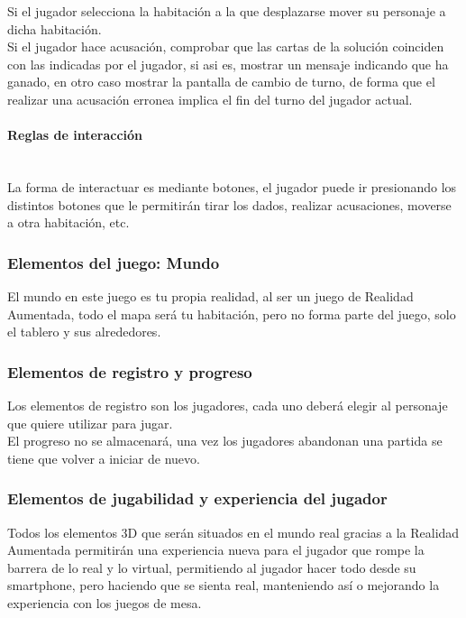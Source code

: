 Si el jugador selecciona la habitación a la que desplazarse mover su personaje a dicha habitación.\\

Si el jugador hace acusación, comprobar que las cartas de la solución coinciden con las indicadas por el jugador, si asi es, mostrar un mensaje indicando que ha ganado, en otro caso mostrar la pantalla de cambio de turno, de forma que el realizar una acusación erronea implica el fin del turno del jugador actual.

\paragraph{Reglas de interacción}\mbox{}\\
La forma de interactuar es mediante botones, el jugador puede ir presionando los distintos botones que le permitirán tirar los dados, realizar acusaciones, moverse a otra habitación, etc.

\subsubsection{Elementos del juego: Mundo}
El mundo en este juego es tu propia realidad, al ser un juego de Realidad Aumentada, todo el mapa será tu habitación, pero no forma parte del juego, solo el tablero y sus alrededores.


\subsubsection{Elementos de registro y progreso}
Los elementos de registro son los jugadores, cada uno deberá elegir al personaje que quiere utilizar para jugar.\\

El progreso no se almacenará, una vez los jugadores abandonan una partida se tiene que volver a iniciar de nuevo.

\subsubsection{Elementos de jugabilidad y experiencia del jugador}
Todos los elementos 3D que serán situados en el mundo real gracias a la Realidad Aumentada permitirán una experiencia nueva para el jugador que rompe la barrera de lo real y lo virtual, permitiendo al jugador hacer todo desde su smartphone, pero haciendo que se sienta real, manteniendo así o mejorando la experiencia con los juegos de mesa.


